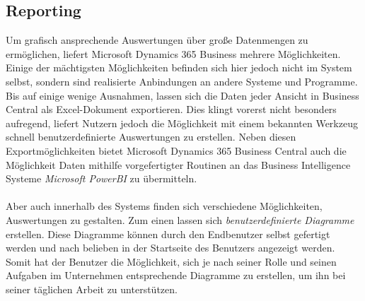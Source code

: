 \subsection{Reporting}
Um grafisch ansprechende Auswertungen über große Datenmengen zu ermöglichen, liefert Microsoft Dynamics 365 Business mehrere Möglichkeiten. Einige der mächtigsten Möglichkeiten befinden sich hier jedoch nicht im System selbst, sondern sind realisierte Anbindungen an andere Systeme und Programme. Bis auf einige wenige Ausnahmen, lassen sich die Daten jeder Ansicht in Business Central als Excel-Dokument exportieren. Dies klingt vorerst nicht besonders aufregend, liefert Nutzern jedoch die Möglichkeit mit einem bekannten Werkzeug schnell benutzerdefinierte Auswertungen zu erstellen. Neben diesen Exportmöglichkeiten bietet Microsoft Dynamics 365 Business Central auch die Möglichkeit Daten mithilfe vorgefertigter Routinen an das Business Intelligence Systeme \textit{Microsoft PowerBI} zu übermitteln. 
\paragraph{}

Aber auch innerhalb des Systems finden sich verschiedene Möglichkeiten, Auswertungen zu gestalten. Zum einen lassen sich \textit{benutzerdefinierte Diagramme} erstellen. Diese Diagramme können durch den Endbenutzer selbst gefertigt werden und nach belieben in der Startseite des Benutzers angezeigt werden. Somit hat der Benutzer die Möglichkeit, sich je nach seiner Rolle und seinen Aufgaben im Unternehmen entsprechende Diagramme zu erstellen, um ihn bei seiner täglichen Arbeit zu unterstützen. 
\paragraph{}

